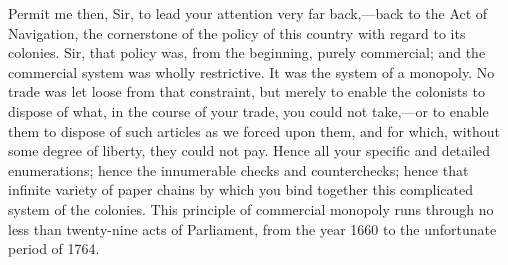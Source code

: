 Permit me then, Sir, to lead your attention very far back,—back to the Act of Navigation, the cornerstone of the policy of this country with regard to its colonies. Sir, that policy was, from the beginning, purely commercial; and the commercial system was wholly restrictive. It was the system of a monopoly. No trade was let loose from that constraint, but merely to enable the colonists to dispose of what, in the course of your trade, you could not take,—or to enable them to dispose of such articles as we forced upon them, and for which, without some degree of liberty, they could not pay. Hence all your specific and detailed enumerations; hence the innumerable checks and counterchecks; hence that infinite variety of paper chains by which you bind together this complicated system of the colonies. This principle of commercial monopoly runs through no less than twenty-nine acts of Parliament, from the year 1660 to the unfortunate period of 1764.

